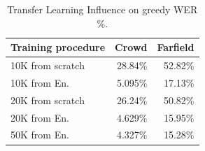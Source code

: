 \documentclass[a4paper]{article}
\begin{document}
\begin{table}[t]
  \caption{Transfer Learning Influence on greedy WER \%.}
  \label{tab:wer_50k}
  \centering
  \begin{tabular}{lrr}
    \toprule
    \textbf{Training procedure } & \textbf{Crowd} & \textbf{Farfield} \\
    \midrule
    10K from scratch   &  28.84\%   & 52.82\% \\
    10K from En.    & 5.095\%       & 17.13\%  \\
    \midrule
    20K from scratch   &  26.24\%   & 50.82\% \\
    20K from En.    & 4.629\%       & 15.95\% \\
    \midrule
    50K from En.    & 4.327\%       & 15.28\% \\
    \bottomrule
  \end{tabular}
\end{table}
\end{document}
